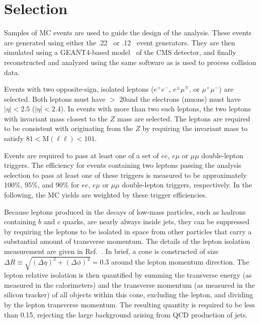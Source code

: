 \section{Selection}
\label{sec:eventSelection}


Samples of  MC events are used to  guide the  design of  the analysis.
These      events     are      generated     using      either     the
.22~\cite{Pythia}  or  .12~\cite{Madgraph} event
generators.    They   are   then   simulated  using   a   GEANT4-based
model~\cite{Geant} of the CMS  detector, and finally reconstructed and
analyzed using the same software as is used to process collision data.

Events with     two     opposite-sign,     isolated    leptons     ($e^+e^-$,
$e^{\pm}\mu^{\mp}$, or $\mu^+\mu^-$) are selected. Both leptons must have
\pt $>$ 20\GeVc and the electrons (muons) must have $|\eta| < 2.5$ ($|\eta| < 2.4$). In events
with more  than two such leptons,   the two  leptons with invariant mass
closest to the $Z$ mass are selected. The leptons are required to be
consistent with originating from the $Z$ by requiring the invariant
mass to satisfy $81 < \mathrm{M(\ell\ell)} < 101$\GeVcc.

Events are required to pass  at least one  of a set of $ee$, $e\mu$ or $\mu\mu$
double-lepton triggers.  The  efficiency for events containing two 
leptons passing the analysis selection to  pass at  least  one of  these
triggers  is measured to be approximately 100\%, 95\%, and 90\%
for $ee$, $e\mu$ or $\mu\mu$ double-lepton triggers, respectively.
In the following, the MC yields are weighted by these trigger efficiencies.

Because leptons produced in the  decays of low-mass particles, such as
hadrons containing $b$  and $c$ quarks,  are  nearly  always inside  jets,  they can  be
suppressed by requiring the leptons to be isolated in space from other
particles that carry a  substantial amount of transverse momentum. The
details   of   the  lepton   isolation   measurement   are  given   in
Ref.~\cite{ref:top}.   In  brief,   a cone is constructed     of  size
$\Delta{}R\equiv\sqrt{(\Delta\eta)^2+(\Delta\phi)^2}=0.3$  around  the
lepton  momentum  direction. The  lepton  relative  isolation is  then
quantified  by  summing the  transverse  energy  (as  measured in  the
calorimeters) and the transverse  momentum (as measured in the silicon
tracker) of  all objects  within this cone,  excluding the  lepton, and
dividing by  the lepton transverse momentum. The resulting quantity
is required to be  less than 0.15, rejecting
the large background arising from QCD production of jets.

